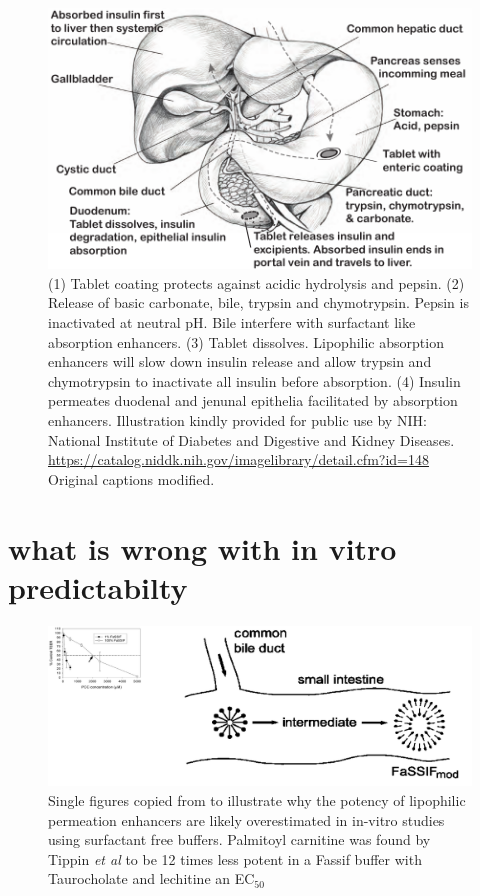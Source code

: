 \begin{figure}[h]

\includegraphics{graphics/intro_anatomy2.pdf}
\caption{(1) Tablet coating protects against acidic hydrolysis and pepsin. (2) Release of basic carbonate, bile, trypsin and chymotrypsin. Pepsin is inactivated at neutral pH. Bile interfere with surfactant like absorption enhancers. (3) Tablet dissolves. Lipophilic absorption enhancers will slow down insulin release and allow trypsin and chymotrypsin to inactivate all insulin before absorption. (4) Insulin permeates duodenal and jenunal epithelia facilitated by absorption enhancers. Illustration kindly provided for public use by NIH: National Institute of Diabetes and Digestive and Kidney Diseases. \url{https://catalog.niddk.nih.gov/imagelibrary/detail.cfm?id=148} Original captions modified.}
\label{intro_glucoseTolerance}
\end{figure}

\section{what is wrong with in vitro predictabilty}

\begin{figure}[h]
\label{devel_fassif}
\includegraphics{graphics/devel_Fasssif_PCC2.png}
\caption{Single figures copied from \cite{tippin2008biorelevant,nawroth2011liposome} to illustrate why the potency of lipophilic permeation enhancers are likely overestimated in in-vitro studies using surfactant free buffers. Palmitoyl carnitine was found by Tippin \textit{et al} to be 12 times less potent in a Fassif buffer with Taurocholate and lechitine an EC$_{50}$}
\end{figure}




